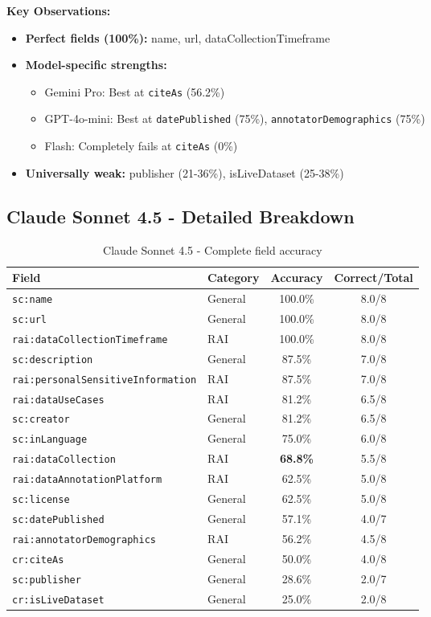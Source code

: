 \documentclass[11pt,a4paper]{article}
\begin{document}
\textbf{Key Observations:}
\begin{itemize}
    \item \textbf{Perfect fields (100\%):} name, url, dataCollectionTimeframe
    \item \textbf{Model-specific strengths:}
    \begin{itemize}
        \item Gemini Pro: Best at \texttt{citeAs} (56.2\%)
        \item GPT-4o-mini: Best at \texttt{datePublished} (75\%), \texttt{annotatorDemographics} (75\%)
        \item Flash: Completely fails at \texttt{citeAs} (0\%)
    \end{itemize}
    \item \textbf{Universally weak:} publisher (21-36\%), isLiveDataset (25-38\%)
\end{itemize}

\subsection{Claude Sonnet 4.5 - Detailed Breakdown}

\begin{table}[h]
\centering
\begin{tabular}{llcc}
\toprule
\textbf{Field} & \textbf{Category} & \textbf{Accuracy} & \textbf{Correct/Total} \\
\midrule
\texttt{sc:name} & General & 100.0\% & 8.0/8 \\
\texttt{sc:url} & General & 100.0\% & 8.0/8 \\
\texttt{rai:dataCollectionTimeframe} & RAI & 100.0\% & 8.0/8 \\
\texttt{sc:description} & General & 87.5\% & 7.0/8 \\
\texttt{rai:personalSensitiveInformation} & RAI & 87.5\% & 7.0/8 \\
\texttt{rai:dataUseCases} & RAI & 81.2\% & 6.5/8 \\
\texttt{sc:creator} & General & 81.2\% & 6.5/8 \\
\texttt{sc:inLanguage} & General & 75.0\% & 6.0/8 \\
\texttt{rai:dataCollection} & RAI & \textbf{68.8\%} & 5.5/8 \\
\texttt{rai:dataAnnotationPlatform} & RAI & 62.5\% & 5.0/8 \\
\texttt{sc:license} & General & 62.5\% & 5.0/8 \\
\texttt{sc:datePublished} & General & 57.1\% & 4.0/7 \\
\texttt{rai:annotatorDemographics} & RAI & 56.2\% & 4.5/8 \\
\texttt{cr:citeAs} & General & 50.0\% & 4.0/8 \\
\texttt{sc:publisher} & General & \textcolor{errorred}{28.6\%} & 2.0/7 \\
\texttt{cr:isLiveDataset} & General & \textcolor{errorred}{25.0\%} & 2.0/8 \\
\bottomrule
\end{tabular}
\caption{Claude Sonnet 4.5 - Complete field accuracy}
\end{table}
\end{document}
